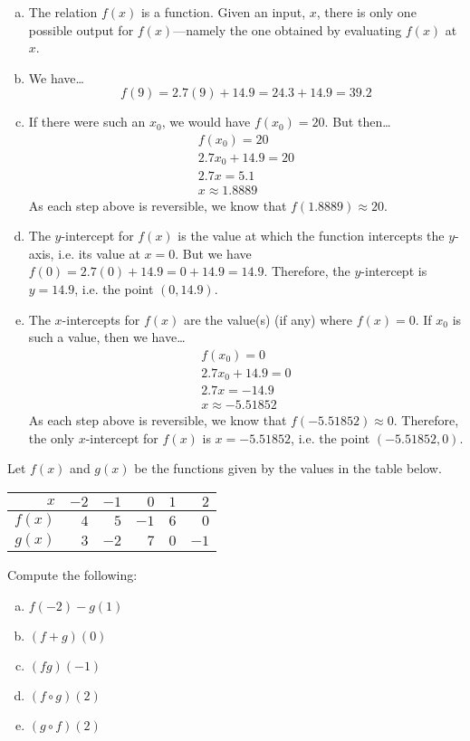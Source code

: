 \documentclass[11pt,letterpaper]{article}
\begin{document}
\sol 
\begin{enumerate}[(a)]
\item The relation $f(x)$ is a function. Given an input, $x$, there is only one possible output for $f(x)$---namely the one obtained by evaluating $f(x)$ at $x$. \pspace

\item We have\dots
	\[
	f(9)= 2.7(9) + 14.9= 24.3 + 14.9= 39.2 
	\] \pspace

\item If there were such an $x_0$, we would have $f(x_0)= 20$. But then\dots
	\[
	\begin{gathered}
	f(x_0)= 20 \\
	2.7x_0 + 14.9= 20 \\
	2.7x= 5.1 \\
	x\approx 1.8889
	\end{gathered}
	\]
As each step above is reversible, we know that $f(1.8889) \approx 20$. \pspace

\item The $y$-intercept for $f(x)$ is the value at which the function intercepts the $y$-axis, i.e. its value at $x= 0$. But we have $f(0)= 2.7(0) + 14.9= 0 + 14.9= 14.9$. Therefore, the $y$-intercept is $y= 14.9$, i.e. the point $(0, 14.9)$. \pspace

\item The $x$-intercepts for $f(x)$ are the value(s) (if any) where $f(x)= 0$. If $x_0$ is such a value, then we have\dots
	\[
	\begin{gathered}
	f(x_0)= 0 \\
	2.7x_0 + 14.9= 0 \\
	2.7x= -14.9 \\
	x\approx -5.51852
	\end{gathered}
	\]
As each step above is reversible, we know that $f(-5.51852) \approx 0$. Therefore, the only $x$-intercept for $f(x)$ is $x= -5.51852$, i.e. the point $(-5.51852, 0)$. 
\end{enumerate}



\newpage



 Let $f(x)$ and $g(x)$ be the functions given by the values in the table below. \par
	\begin{table}[H]
	\centering
	\begin{tabular}{r||rrrrr}
	$x$ & $-2$ & $-1$ & $0$ & $1$ & $2$ \\ \hline
	$f(x)$ & $4$ & $5$ & $-1$ & $6$ & $0$ \\
	$g(x)$ & $3$ & $-2$ & $7$ & $0$ & $-1$
	\end{tabular}
	\end{table} \par
Compute the following:
	\begin{enumerate}[(a)]
	\item $f(-2) - g(1)$ 
	\item $(f + g)(0)$
	\item $(fg)(-1)$
	\item $(f \circ g)(2)$
	\item $(g \circ f)(2)$
	\end{enumerate} \pspace
\end{document}
